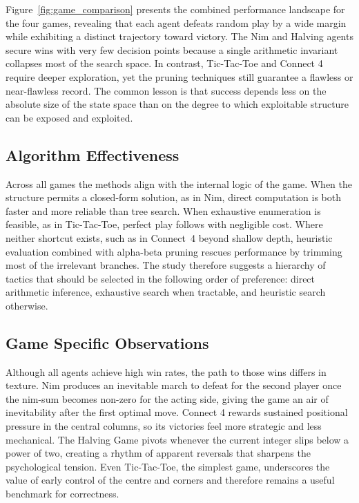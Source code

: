 \documentclass[12pt]{article}
\begin{document}
Figure~\ref{fig:game_comparison} presents the combined performance landscape for the four games, revealing that each agent defeats random play by a wide margin while exhibiting a distinct trajectory toward victory. The Nim and Halving agents secure wins with very few decision points because a single arithmetic invariant collapses most of the search space. In contrast, Tic-Tac-Toe and Connect 4 require deeper exploration, yet the pruning techniques still guarantee a flawless or near-flawless record. The common lesson is that success depends less on the absolute size of the state space than on the degree to which exploitable structure can be exposed and exploited.

\subsection{Algorithm Effectiveness}

Across all games the methods align with the internal logic of the game. When the structure permits a closed-form solution, as in Nim, direct computation is both faster and more reliable than tree search. When exhaustive enumeration is feasible, as in Tic-Tac-Toe, perfect play follows with negligible cost. Where neither shortcut exists, such as in Connect 4 beyond shallow depth, \gls{heuristic} evaluation combined with alpha-beta pruning rescues performance by trimming most of the irrelevant branches. The study therefore suggests a hierarchy of tactics that should be selected in the following order of preference: direct arithmetic inference, exhaustive search when tractable, and heuristic search otherwise.

\subsection{Game Specific Observations}

Although all agents achieve high win rates, the path to those wins differs in texture. Nim produces an inevitable march to defeat for the second player once the \gls{nim-sum} becomes non-zero for the acting side, giving the game an air of inevitability after the first optimal move. Connect 4 rewards sustained positional pressure in the central columns, so its victories feel more strategic and less mechanical. The Halving Game pivots whenever the current integer slips below a power of two, creating a rhythm of apparent reversals that sharpens the psychological tension. Even Tic-Tac-Toe, the simplest game, underscores the value of early control of the centre and corners and therefore remains a useful benchmark for correctness.
\end{document}
